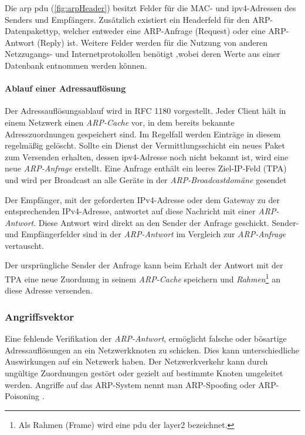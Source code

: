 Die \gls{arp} \gls{pdu} (\ref{fig:arpHeader}) besitzt Felder für die MAC- und \gls{ipv4}-Adressen des Senders und Empfängers. Zusätzlich existiert ein Headerfeld für den ARP-Datenpakettyp, welcher entweder eine ARP-Anfrage (Request) oder eine ARP-Antwort (Reply) ist. Weitere Felder werden für die Nutzung von anderen Netzzugangs- und Internetprotokollen benötigt  \cite{RFC0826},wobei deren Werte aus einer Datenbank entnommen werden \cite{RFC3232,RFC2390} können. 

\paragraph{Ablauf einer Adressauflösung}
Der Adressauflösungsablauf wird in RFC 1180 \cite{RFC1180} vorgestellt. Jeder Client hält in einem Netzwerk einen \emph{ARP-Cache} vor, in dem bereits bekannte Adresszuordnungen gespeichert sind. Im Regelfall werden Einträge in diesem regelmäßig gelöscht. Sollte ein Dienst der Vermittlungsschicht ein neues Paket zum Versenden erhalten, dessen \gls{ipv4}-Adresse noch nicht bekannt ist, wird eine neue \emph{ARP-Anfrage} erstellt. Eine Anfrage enthält ein leeres Ziel-IP-Feld (TPA) und wird per Broadcast an alle Geräte in der \emph{ARP-Broadcastdomäne} gesendet 

Der Empfänger, mit der geforderten IPv4-Adresse oder dem Gateway zu der entsprechenden IPv4-Adresse, antwortet auf diese Nachricht mit einer \emph{ARP-Antwort}. Diese Antwort wird direkt an den Sender der Anfrage geschickt. Sender- und Empfängerfelder sind in der \emph{ARP-Antwort} im Vergleich zur \emph{ARP-Anfrage} vertauscht.

Der ursprüngliche Sender der Anfrage kann beim Erhalt der Antwort mit der TPA eine neue Zuordnung in seinem \emph{ARP-Cache} speichern und \emph{Rahmen}\footnote{Als Rahmen (Frame) wird eine \gls{pdu} der \gls{layer2} bezeichnet.} an diese Adresse versenden.

\subsubsection{Angriffsvektor}
Eine fehlende Verifikation der \emph{ARP-Antwort}, ermöglicht falsche oder bösartige Adressauflösungen an ein Netzwerkknoten zu schicken. Dies kann unterschiedliche Auswirkungen auf ein Netzwerk haben. Der Netzwerkverkehr kann durch ungültige Zuordnungen gestört oder gezielt auf bestimmte Knoten umgeleitet werden. Angriffe auf das ARP-System nennt man ARP-Spoofing oder ARP-Poisoning \cite{BSIGlossar}.

